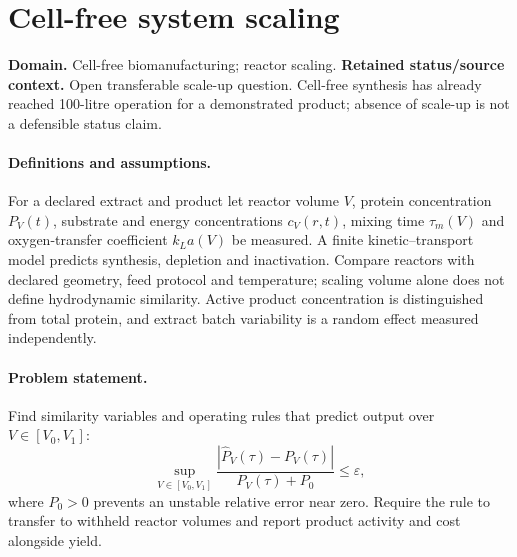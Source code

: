 \documentclass[11pt]{article}
\begin{document}
\section*{Cell-free system scaling}
\label{prob:277}
\label{rank:186}
\par\smallskip

\noindent\textbf{Domain.} Cell-free biomanufacturing; reactor scaling. \quad \textbf{Retained status/source context.} Open transferable scale-up question. Cell-free synthesis has already reached 100-litre operation for a demonstrated product; absence of scale-up is not a defensible status claim.

\paragraph{Definitions and assumptions.} For a declared extract and product let reactor volume $V$, protein concentration $P_V(t)$, substrate and energy concentrations $c_V(r,t)$, mixing time $\tau_m(V)$ and oxygen-transfer coefficient $k_La(V)$ be measured. A finite kinetic--transport model predicts synthesis, depletion and inactivation. Compare reactors with declared geometry, feed protocol and temperature; scaling volume alone does not define hydrodynamic similarity. Active product concentration is distinguished from total protein, and extract batch variability is a random effect measured independently.

\paragraph{Problem statement.} Find similarity variables and operating rules that predict output over $V\in[V_0,V_1]$:
\[
\sup_{V\in[V_0,V_1]}\frac{|\widehat P_V(\tau)-P_V(\tau)|}{P_V(\tau)+P_0}\leq\varepsilon,
\]
where $P_0>0$ prevents an unstable relative error near zero. Require the rule to transfer to withheld reactor volumes and report product activity and cost alongside yield.
\end{document}
